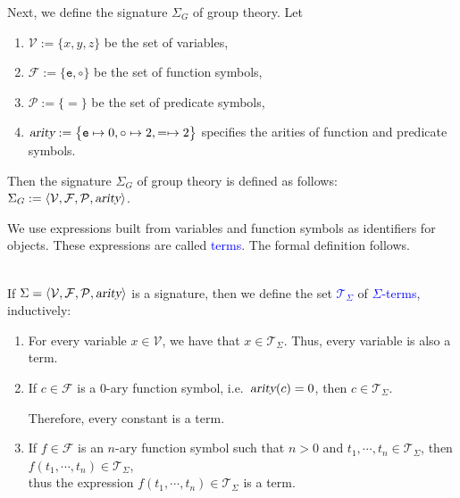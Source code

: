\exampleEng
Next, we define the signature $\Sigma_G$ of group theory. Let
\begin{enumerate}
\item $\mathcal{V} := \{ x, y, z \}$ be the set of variables,
\item $\mathcal{F} := \{ \mathtt{e}, \circ \}$ be the set of function symbols,
\item $\mathcal{P} := \{\mathtt{=} \}$ be the set of predicate symbols,
\item $\textsl{arity} := \bigl\{ \mathtt{e} \mapsto 0, \mathtt{\circ} \mapsto 2, = \mapsto 2 \bigr\}$
      specifies the arities of function and predicate symbols.
\end{enumerate}
Then the signature $\Sigma_G$ of group theory is defined as follows:
\\[0.2cm]
\hspace*{1.3cm}
$\Sigma_G := \langle \mathcal{V}, \mathcal{F}, \mathcal{P}, \textsl{arity} \rangle$.
\eox
\vspace{0.3cm}

\noindent
We use expressions built from variables and function symbols as identifiers for objects. These expressions are
called \textcolor{blue}{terms}. The formal definition follows.

\begin{Definition} \hspace*{\fill} \\
  If $\Sigma = \langle \mathcal{V}, \mathcal{F}, \mathcal{P}, \textsl{arity} \rangle$ is a signature, then we
  define the set \textcolor{blue}{$\mathcal{T}_\Sigma$}   of
  \textcolor{blue}{$\Sigma$-terms}, 
  inductively:
  \begin{enumerate}
  \item For every variable $x \in \mathcal{V}$, we have that $x \in \mathcal{T}_\Sigma$. Thus, every variable is also a term.
  \item If $c \in \mathcal{F}$ is a $0$-ary function symbol,
        i.e.~$\textsl{arity}(c) = 0$, then $c \in \mathcal{T}_\Sigma$.

        Therefore, every constant is a term.
  \item If $f \in \mathcal{F}$ is an $n$-ary function symbol such that $n > 0$ and 
        $t_1,\cdots,t_n \in \mathcal{T}_\Sigma$, then 
        \\[0.2cm]
        \hspace*{1.3cm} $f(t_1,\cdots,t_n) \in \mathcal{T}_\Sigma$,
        \\[0.2cm]
        thus the expression $f(t_1,\cdots,t_n) \in \mathcal{T}_\Sigma$ is a term.
        \eox
  \end{enumerate}
\end{Definition}

